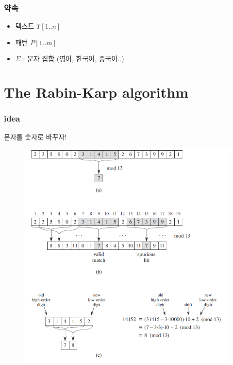 \documentclass[10pt]{beamer}
\begin{document}
\begin{frame}
    \tableofcontents
\end{frame}


\begin{frame}
    \frametitle{약속}
    \begin{itemize}
        \item 텍스트 $T[1..n]$ 
        \item 패턴 $P[1..m]$
        \item $\Sigma$ : 문자 집합 (영어, 한국어, 중국어..)
    \end{itemize}
\end{frame}



\section{The Rabin-Karp algorithm}

\begin{frame}
    \frametitle{idea}
    문자를 숫자로 바꾸자!
\end{frame}


\begin{frame}
    \begin{figure}[h!]
        \centering
        \includegraphics[scale=0.4]{pic1.PNG}
    \end{figure}
\end{frame}
\end{document}
